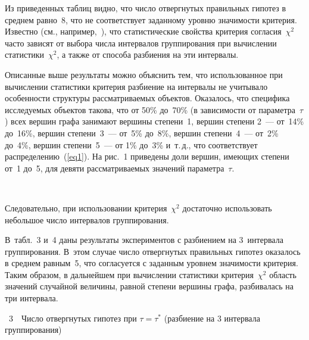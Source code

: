 \begin{multicols}{2}
Из приведенных таблиц видно, что число отвергнутых правильных
гипотез  в среднем равно~8, что не соответствует заданному уровню
зна\-чи\-мости критерия. Известно (см., например,~\cite{Aivaz,Lem}), что
статистические свойства критерия согласия~$\chi^2$ час\-то зависят от
выбора числа интервалов группирования при вычислении статистики~$\chi^2$, 
а также от 
 способа разбиения на эти интервалы. 
 
 Описанные выше результаты можно объяснить тем, что использованное при
вычислении статистики критерия разбиение на интервалы не учитывало
особенности структуры рассматриваемых объектов. Оказалось, что
специфика исследуемых объектов такова, что от 50\% до~70\% (в
зависимости от параметра~$\tau$) всех вершин графа занимают вершины
степени~1, вершин степени 2~--- от~14\% до~16\%, вершин степени~3~--- 
от~5\% до~8\%, вершин степени~4~--- от~2\% до~4\%, вершин степени~5~--- от 1\%
до~3\% и~т.\,д., что соответствует распределению~(\ref{eq1}). На рис.~1 
приведены доли вершин, имеющих степени от~1 до~5, для девяти
рассматриваемых значений параметра~$\tau$.

\begin{figure*} %
\vspace*{1pt}
\begin{center}
\mbox{%
\epsfxsize=105.049mm
}
\end{center}
\vspace*{-11pt}
\end{figure*}

Следовательно, при использовании критерия~$\chi^2$ достаточно
использовать небольшое число интервалов группирования. 

В~табл.~3 и~4 
даны результаты экспериментов с разбиением на 3~интервала
группирования.
%
В~этом случае число отвергнутых правильных гипотез оказалось в
среднем равным~5, что согласуется с заданным уровнем значимости
критерия. Таким образом, в дальнейшем при вычислении статистики
критерия~$\chi^2$ область значений случайной величины, равной
степени вершины графа, разбивалась на три интервала.


\noindent
{{\tablename~3}\ \ \small{Число отвергнутых гипотез при $\tau = \tau^*$
(разбиение на 3 интервала группирования)}}
\vspace*{6pt}


\end{multicols}
